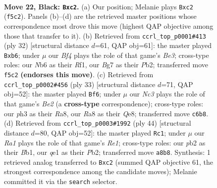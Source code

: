 \documentclass[11pt]{article}
\begin{document}
\clearpage

\begin{figure}[p]\centering
\begin{subfigure}{0.46\textwidth}\centering
\resizebox{\linewidth}{!}{%
\newchessgame
\chessboard[
  setfen={r5k1/pp3pb1/1nn2qp1/3p1b1p/3P4/1B4BP/PPN2PP1/RN2Q1K1 b - - 1 22},
  showmover=false,
  pgfstyle=straightmove, color=movearrow, markmove={f5-c2}
]}
\caption{}
\end{subfigure}\hfill
\begin{subfigure}{0.46\textwidth}\centering
\resizebox{\linewidth}{!}{%
\newchessgame
\chessboard[
  setfen={5rk1/2q1bpp1/Bn2bn1p/3pp3/4P3/1NN1B2P/1PP1QPP1/5RK1 w - - 0 17},
  showmover=false,
  pgfstyle=straightmove, color=movearrow, markmove={e3-b6}
]}
\caption{}
\end{subfigure}
\\[4pt]
\begin{subfigure}{0.46\textwidth}\centering
\resizebox{\linewidth}{!}{%
\newchessgame
\chessboard[
  setfen={r3q1k1/pbp1bpp1/1p4np/3n4/1PNN4/2P5/P1QB1PPP/R4BK1 b - - 4 17},
  showmover=false,
  pgfstyle=straightmove, color=movearrow, markmove={e7-f6}
]}
\caption{}
\end{subfigure}\hfill
\begin{subfigure}{0.46\textwidth}\centering
\resizebox{\linewidth}{!}{%
\newchessgame
\chessboard[
  setfen={rb3nk1/1b4p1/pq2p2p/1p6/P1p1N3/4PN1P/1PQ2PP1/1B2R1K1 w - - 1 23},
  showmover=false,
  pgfstyle=straightmove, color=movearrow, markmove={e1-c1}
]}
\caption{}
\end{subfigure}
\caption{\textbf{Move 22, Black: \texttt{Bxc2}.} (a) Our position; Melanie plays \texttt{Bxc2} (\texttt{f5c2}). Panels (b)--(d) are the retrieved master positions whose correspondence most drove this move (highest QAP objective among those that transfer to it). (b) Retrieved from \texttt{ccrl\_top\_p0001\#413} (ply 32) [structural distance $d$=61, QAP obj=61]: the master played \texttt{Bxb6}; under $\mu$ our \emph{Bf4} plays the role of that game's \emph{Be3}; cross-type roles: our \emph{N}b6 as their \emph{R}f1, our \emph{B}g7 as their \emph{P}b2; transferred move \texttt{f5c2} \textbf{(endorses this move)}. (c) Retrieved from \texttt{ccrl\_top\_p0002\#456} (ply 33) [structural distance $d$=71, QAP obj=52]: the master played \texttt{Bf6}; under $\mu$ our \emph{Nc3} plays the role of that game's \emph{Be2} (a \textbf{cross-type} correspondence); cross-type roles: our \emph{p}h3 as their \emph{R}a8, our \emph{R}a8 as their \emph{Q}e8; transferred move \texttt{c6b8}. (d) Retrieved from \texttt{ccrl\_top\_p0003\#1992} (ply 44) [structural distance $d$=80, QAP obj=52]: the master played \texttt{Rc1}; under $\mu$ our \emph{Ra1} plays the role of that game's \emph{Re1}; cross-type roles: our \emph{p}b2 as their \emph{B}b1, our \emph{q}e1 as their \emph{P}b2; transferred move \texttt{a8b8}. Synthesis: 1 retrieved analog transferred to \texttt{Bxc2} (summed QAP objective 61, the strongest correspondence among the candidate moves); Melanie committed it via the \texttt{search} selector.}
\label{fig:thought-m43}
\end{figure}
\end{document}

